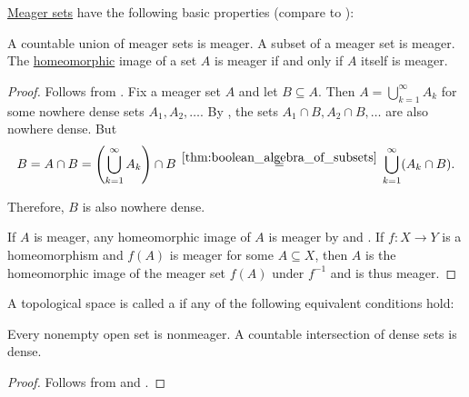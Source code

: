 \begin{proposition}\label{thm:def:meager_set/properties}
  \hyperref[def:meager_set]{Meager sets} have the following basic properties (compare to ):
  \begin{thmenum}
     A countable union of meager sets is meager.
     A subset of a meager set is meager.
     The \hyperref[def:homeomorphism]{homeomorphic} image of a set \( A \) is meager if and only if \( A \) itself is meager.
  \end{thmenum}
\end{proposition}
\begin{proof}
   Follows from .
   Fix a meager set \( A \) and let \( B \subseteq A \). Then \( A = \bigcup_{k=1}^\infty A_k \) for some nowhere dense sets \( A_1, A_2, \ldots \). By , the sets \( A_1 \cap B, A_2 \cap B, \ldots \) are also nowhere dense. But
  \begin{equation*}
    B
    =
    A \cap B
    =
    \left(\bigcup_{k=1}^\infty A_k \right) \cap B
    \reloset {\ref{thm:boolean_algebra_of_subsets}} =
    \bigcup_{k=1}^\infty (A_k \cap B).
  \end{equation*}

  Therefore, \( B \) is also nowhere dense.

  \hfill
  \NecessitySubProof If \( A \) is meager, any homeomorphic image of \( A \) is meager by  and .
  \SufficiencySubProof If \( f: X \to Y \) is a homeomorphism and \( f(A) \) is meager for some \( A \subseteq X \), then \( A \) is the homeomorphic image of the meager set \( f(A) \) under \( f^{-1} \) and is thus meager.
\end{proof}

\begin{definition}\label{def:baire_space}
  A topological space is called a  if any of the following equivalent conditions hold:
  \begin{thmenum}
     Every nonempty open set is nonmeager.
     A countable intersection of dense sets is dense.
  \end{thmenum}
\end{definition}
\begin{proof}
   Follows from  and .
\end{proof}

